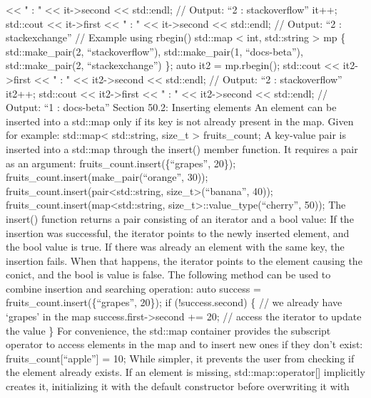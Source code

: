 \textless\textless{} " : " \textless\textless{} it-\textgreater second
\textless\textless{} std::endl; // Output: ``2 : stackoverflow'' it++;
std::cout \textless\textless{} it-\textgreater first
\textless\textless{} " : " \textless\textless{} it-\textgreater second
\textless\textless{} std::endl; // Output: ``2 : stackexchange'' //
Example using rbegin() std::map \textless{} int, std::string
\textgreater{} mp \{ std::make\_pair(2, ``stackoverflow''),
std::make\_pair(1, ``docs-beta''), std::make\_pair(2, ``stackexchange'')
\}; auto it2 = mp.rbegin(); std::cout \textless\textless{}
it2-\textgreater first \textless\textless{} " : " \textless\textless{}
it2-\textgreater second \textless\textless{} std::endl; // Output: ``2 :
stackoverflow'' it2++; std::cout \textless\textless{}
it2-\textgreater first \textless\textless{} " : " \textless\textless{}
it2-\textgreater second \textless\textless{} std::endl; // Output: ``1 :
docs-beta'' Section 50.2: Inserting elements An element can be inserted
into a std::map only if its key is not already present in the map. Given
for example: std::map\textless{} std::string, size\_t \textgreater{}
fruits\_count; A key-value pair is inserted into a std::map through the
insert() member function. It requires a pair as an argument:
fruits\_count.insert(\{``grapes'', 20\});
fruits\_count.insert(make\_pair(``orange'', 30));
fruits\_count.insert(pair\textless std::string,
size\_t\textgreater(``banana'', 40));
fruits\_count.insert(map\textless std::string,
size\_t\textgreater::value\_type(``cherry'', 50)); The insert() function
returns a pair consisting of an iterator and a bool value: If the
insertion was successful, the iterator points to the newly inserted
element, and the bool value is true. If there was already an element
with the same key, the insertion fails. When that happens, the iterator
points to the element causing the conict, and the bool is value is
false. The following method can be used to combine insertion and
searching operation: auto success = fruits\_count.insert(\{``grapes'',
20\}); if (!success.second) \{ // we already have `grapes' in the map
success.first-\textgreater second += 20; // access the iterator to
update the value \} For convenience, the std::map container provides the
subscript operator to access elements in the map and to insert new ones
if they don't exist: fruits\_count{[}``apple''{]} = 10; While simpler,
it prevents the user from checking if the element already exists. If an
element is missing, std::map::operator{[}{]} implicitly creates it,
initializing it with the default constructor before overwriting it with

